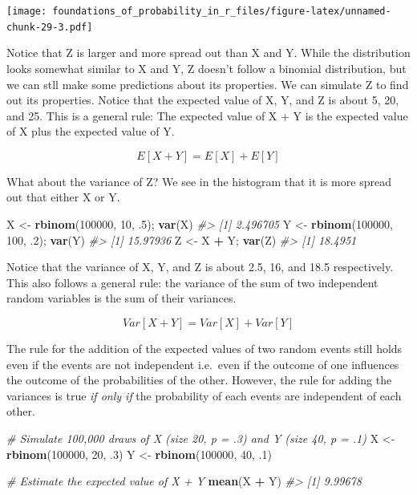 \documentclass[]{article}
\newenvironment{Shaded}{\begin{snugshade}}{\end{snugshade}}
\newcommand{\CommentTok}[1]{\textcolor[rgb]{0.56,0.35,0.01}{\textit{#1}}}
\newcommand{\DecValTok}[1]{\textcolor[rgb]{0.00,0.00,0.81}{#1}}
\newcommand{\FloatTok}[1]{\textcolor[rgb]{0.00,0.00,0.81}{#1}}
\newcommand{\KeywordTok}[1]{\textcolor[rgb]{0.13,0.29,0.53}{\textbf{#1}}}
\newcommand{\NormalTok}[1]{#1}
\newcommand{\OperatorTok}[1]{\textcolor[rgb]{0.81,0.36,0.00}{\textbf{#1}}}
\newcommand{\StringTok}[1]{\textcolor[rgb]{0.31,0.60,0.02}{#1}}
\begin{document}
\texttt{[image: foundations\_of\_probability\_in\_r\_files/figure-latex/unnamed-chunk-29-3.pdf]}

Notice that Z is larger and more spread out than X and Y. While the
distribution looks somewhat similar to X and Y, Z doesn't follow a
binomial distribution, but we can stll make some predictions about its
properties. We can simulate Z to find out its properties. Notice that
the expected value of X, Y, and Z is about 5, 20, and 25. This is a
general rule: The expected value of X + Y is the expected value of X
plus the expected value of Y.

\[E[X + Y] = E[X] + E[Y] \]

What about the variance of Z? We see in the histogram that it is more
spread out that either X or Y.

\begin{Shaded}
\begin{Highlighting}[]
\NormalTok{X <-}\StringTok{ }\KeywordTok{rbinom}\NormalTok{(}\DecValTok{100000}\NormalTok{, }\DecValTok{10}\NormalTok{, }\FloatTok{.5}\NormalTok{); }\KeywordTok{var}\NormalTok{(X)}
\CommentTok{#> [1] 2.496705}
\NormalTok{Y <-}\StringTok{ }\KeywordTok{rbinom}\NormalTok{(}\DecValTok{100000}\NormalTok{, }\DecValTok{100}\NormalTok{, }\FloatTok{.2}\NormalTok{); }\KeywordTok{var}\NormalTok{(Y)}
\CommentTok{#> [1] 15.97936}
\NormalTok{Z <-}\StringTok{ }\NormalTok{X }\OperatorTok{+}\StringTok{ }\NormalTok{Y; }\KeywordTok{var}\NormalTok{(Z)}
\CommentTok{#> [1] 18.4951}
\end{Highlighting}
\end{Shaded}

Notice that the variance of X, Y, and Z is about 2.5, 16, and 18.5
respectively. This also follows a general rule: the variance of the sum
of two independent random variables is the sum of their variances.

\[Var[X + Y] = Var[X] + Var[Y] \]

The rule for the addition of the expected values of two random events
still holds even if the events are not independent i.e.~even if the
outcome of one influences the outcome of the probabilities of the other.
However, the rule for adding the variances is true \emph{if only if} the
probability of each events are independent of each other.

\begin{Shaded}
\begin{Highlighting}[]
\CommentTok{# Simulate 100,000 draws of X (size 20, p = .3) and Y (size 40, p = .1)}
\NormalTok{X <-}\StringTok{ }\KeywordTok{rbinom}\NormalTok{(}\DecValTok{100000}\NormalTok{, }\DecValTok{20}\NormalTok{, }\FloatTok{.3}\NormalTok{)}
\NormalTok{Y <-}\StringTok{ }\KeywordTok{rbinom}\NormalTok{(}\DecValTok{100000}\NormalTok{, }\DecValTok{40}\NormalTok{, }\FloatTok{.1}\NormalTok{)}

\CommentTok{# Estimate the expected value of X + Y}
\KeywordTok{mean}\NormalTok{(X }\OperatorTok{+}\StringTok{ }\NormalTok{Y)}
\CommentTok{#> [1] 9.99678}
\end{Highlighting}
\end{Shaded}
\end{document}
